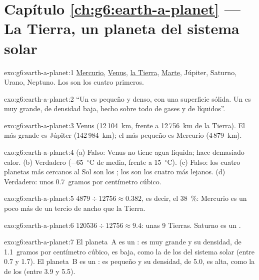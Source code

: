 \section*{Capítulo \ref{ch:g6:earth-a-planet} --- La Tierra, un planeta del sistema solar}

\begin{solution}{exo:g6:earth-a-planet:1}
\underline{Mercurio}, \underline{Venus}, \underline{la Tierra},
\underline{Marte}, Júpiter, Saturno, Urano, Neptuno. Los 
son los cuatro primeros.
\end{solution}

\begin{solution}{exo:g6:earth-a-planet:2}
``Un  es pequeño y denso, con una superficie sólida. Un
 es muy grande, de densidad baja, hecho sobre todo de gases
y de líquidos''.
\end{solution}

\begin{solution}{exo:g6:earth-a-planet:3}
Venus (12\,104~km, frente a 12\,756~km de la Tierra). El más grande es
Júpiter (142\,984~km); el más pequeño es Mercurio (4\,879~km).
\end{solution}

\begin{solution}{exo:g6:earth-a-planet:4}
(a) Falso: Venus no tiene agua líquida; hace demasiado calor. (b) Verdadero
($-65$~$^\circ$C de media, frente a 15~$^\circ$C). (c) Falso: los cuatro
planetas más cercanos al Sol son los ; los  son los cuatro más lejanos. (d) Verdadero: unos 0.7~gramos por
centímetro cúbico.
\end{solution}

\begin{solution}{exo:g6:earth-a-planet:5}
$4879 \div 12756 \approx 0.382$, es decir, el 38~\%: Mercurio es un poco
más de un tercio de ancho que la Tierra.
\end{solution}

\begin{solution}{exo:g6:earth-a-planet:6}
$120536 \div 12756 \approx 9.4$: unas 9 Tierras. Saturno es un .
\end{solution}

\begin{solution}{exo:g6:earth-a-planet:7}
El planeta~A es un : es muy grande y su densidad, de
1.1~gramos por centímetro cúbico, es baja, como la de los 
del sistema solar (entre 0.7 y 1.7). El planeta~B es un : es
pequeño y su densidad, de 5.0, es alta, como la de los 
(entre 3.9 y 5.5).
\end{solution}

